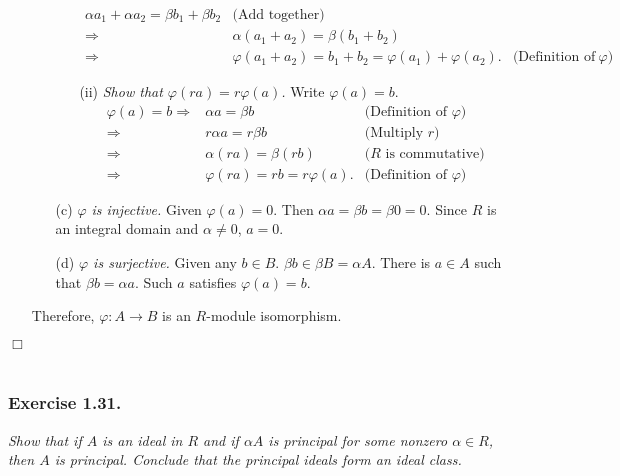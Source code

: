 \documentclass{article}
\begin{document}
\begin{enumerate}
\begin{enumerate}
\begin{enumerate}
\begin{align*}
    \alpha a_1 + \alpha a_2 = \beta b_1 + \beta b_2
      &\text{(Add together)} \\
    \Longrightarrow&
    \alpha (a_1 + a_2) = \beta (b_1 + b_2) \\
    \Longrightarrow&
    \varphi(a_1+a_2) = b_1+b_2 = \varphi(a_1) + \varphi(a_2).
      &\text{(Definition of $\varphi$)}
    \end{align*}
    \item[(ii)]
    \emph{Show that $\varphi(ra) = r\varphi(a)$.}
    Write $\varphi(a) = b$.
    \begin{align*}
    \varphi(a) = b
    \Longrightarrow&
    \alpha a = \beta b
      &\text{(Definition of $\varphi$)} \\
    \Longrightarrow&
    r \alpha a = r \beta b
      &\text{(Multiply $r$)} \\
    \Longrightarrow&
    \alpha(ra) = \beta (rb)
      &\text{($R$ is commutative)} \\
    \Longrightarrow&
    \varphi(ra) = rb = r \varphi(a).
      &\text{(Definition of $\varphi$)}
    \end{align*}
    \end{enumerate}
  \item[(c)]
  \emph{$\varphi$ is injective.}
  Given $\varphi(a) = 0$. Then $\alpha a = \beta b = \beta 0 = 0$.
  Since $R$ is an integral domain and $\alpha \neq 0$, $a = 0$.
  \item[(d)]
  \emph{$\varphi$ is surjective.}
  Given any $b \in B$. $\beta b \in \beta B = \alpha A$.
  There is $a \in A$ such that $\beta b = \alpha a$.
  Such $a$ satisfies $\varphi(a) = b$.
  \end{enumerate}
  Therefore, $\varphi: A \to B$ is an $R$-module isomorphism.
\end{enumerate}
$\Box$ \\\\





\subsubsection*{Exercise 1.31.}
\emph{Show that if $A$ is an ideal in $R$ and if $\alpha A$ is principal
for some nonzero $\alpha \in R$, then $A$ is principal.
Conclude that the principal ideals form an ideal class.} \\
\end{document}
